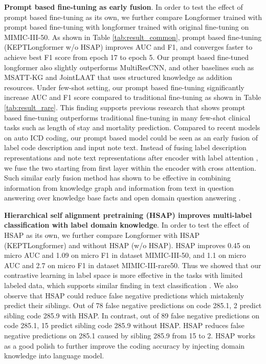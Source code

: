\documentclass[11pt]{article}
\begin{document}
\noindent \textbf{Prompt based fine-tuning as early fusion}.
In order to test the effect of prompt based fine-tuning as its own, we further compare Longformer trained with prompt based fine-tuning with longformer trained with original fine-tuning on MIMIC-III-50. As shown in Table \ref{tab:result_common}, prompt based fine-tuning (KEPTLongformer w/o HSAP) improves AUC and F1, and converges faster to achieve best F1 score from epoch 17 to epoch 5. 
Our prompt based fine-tuned longformer also slightly outperforms MultiResCNN, and other baselines such as MSATT-KG and JointLAAT that uses structured knowledge as addition resources. 
Under few-shot setting, our prompt based fine-tuning significantly increase AUC and F1 score compared to traditional fine-tuning as shown in Table \ref{tab:result_rare}. This finding supports previous research \citep{Taylor2022ClinicalPL} that shows prompt based fine-tuning outperforms traditional fine-tuning in many few-shot clinical tasks such as length of stay and mortality prediction.
Compared to recent models on auto ICD coding, our prompt based model could be seen as an early \textcolor{CarnationPink}{fusion} of label code description and input note text. 
Instead of fusing label description representations and note text representations after encoder with label attention \citep{zhou-etal-2021-automatic, Dong2021ExplainableAC, Yuan2022CodeSD}, we fuse the two starting from first layer within the encoder with cross attention. Such similar early fusion method has shown to be effective in combining information from knowledge graph and information from text in question answering over knowledge base facts \citep{das-etal-2017-question} and open domain question answering \citep{sun-etal-2018-open}. 


\noindent \textbf{Hierarchical self alignment pretraining (HSAP) improves multi-label classification with label domain knowledge}.
In order to test the effect of HSAP as its own, we further compare 
Longformer with HSAP  (KEPTLongformer) and without HSAP (w/o HSAP). HSAP improves 0.45 on micro AUC and 1.09 on micro F1 in dataset MIMIC-III-50, and 1.1 on micro AUC and 2.7 on micro F1 in dataset MIMIC-III-rare50. Thus we showed that our contrastive learning in label space is more effective in the tasks with limited labeled data, which supports similar finding in text classification \citep{Qian2022ContrastiveLF}.
We also observe that HSAP could reduce false negative predictions which mistakenly predict their siblings.
Out of 78 false negative predictions on code 285.1, 2 predict sibling code 285.9 with HSAP.
In contrast, out of 89 false negative predictions on code 285.1, 15 predict sibling code 285.9 without HSAP. 
HSAP reduces false negative predictions on 285.1 caused by sibling 285.9 from 15 to 2. HSAP works as a good polish to further improve the coding accuracy by injecting domain knowledge into language model. 
\end{document}
